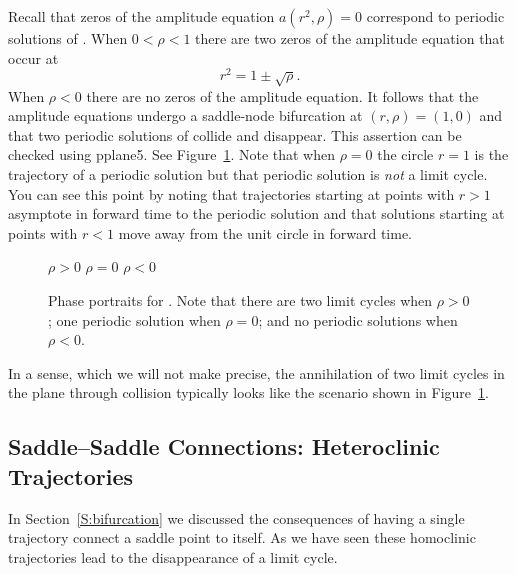 \documentclass{ximera}
\begin{document}
Recall that zeros of the amplitude equation $a(r^2,\rho)=0$ correspond to 
periodic solutions of .  When $0<\rho<1$ there are two zeros of 
the amplitude equation  that occur at 
\[
r^2 = 1 \pm\sqrt{\rho}.
\]
When $\rho<0$ there are no zeros of the amplitude equation.  
It follows that the amplitude equations undergo a saddle-node 
bifurcation at $(r,\rho)=(1,0)$ and that two periodic solutions of 
 collide and disappear.  This assertion can be 
checked using {\sf pplane5}.  
See Figure~\ref{F:papp}. Note that when $\rho=0$
the circle $r=1$ is the trajectory of a periodic solution but that periodic 
solution is {\em not\/} a limit cycle.  You can see this point by noting that 
trajectories starting at points with $r>1$ asymptote in forward time to the 
periodic solution and that solutions starting at points with $r<1$ move away 
from the unit circle in forward time.  

\begin{figure}[htb]
           \centerline{%
	   }
 	\vspace*{-0.2in}
	\hspace{0.3in} $\rho>0$  \hspace{1.9in} $\rho=0$
		\hspace{1.9in} $\rho<0$ 
           \caption{Phase portraits for \protect{}. 
Note that there are two limit cycles when $\rho>0$; one periodic solution 
when  $\rho=0$; and no periodic solutions when $\rho<0$.}
           \label{F:papp}
\end{figure}

In a sense, which we will not make precise, the annihilation of two
limit cycles in the plane through collision typically looks like the 
scenario shown in Figure~\ref{F:papp}.  



\subsection*{Saddle--Saddle Connections: Heteroclinic Trajectories}

In Section~\ref{S:bifurcation} we discussed the consequences of having a 
single trajectory connect a saddle point to itself.  As we have seen these 
homoclinic trajectories lead to the disappearance of a limit cycle.
\end{document}
